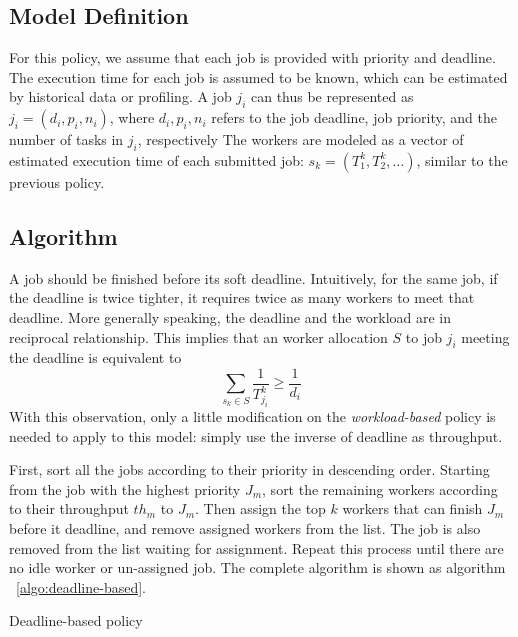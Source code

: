 \subsection{Model Definition}

For this policy, we assume that each job is provided with priority and
deadline.
The execution time for each job is assumed to be known, which can be 
estimated by historical data or profiling.
A job $j_i$ can thus be represented as $j_i = (d_i, p_i, n_i)$, where
$d_i, p_i, n_i$ refers to the job deadline, job priority, and the 
number of tasks in $j_i$, respectively
The workers are modeled as a vector of estimated execution time of each 
submitted job: $s_k = (T^k_1, T^k_2, \ldots)$, similar to the previous 
policy.

\subsection{Algorithm}

A job should be finished before its soft deadline.
Intuitively, for the same job, if the deadline is twice tighter, it
requires twice as many workers to meet that deadline.
More generally speaking, the deadline and the workload are in reciprocal
relationship.
This implies that an worker allocation $S$ to job $j_i$ meeting the
deadline is equivalent to
\[\displaystyle\sum_{s_k \in S}\frac{1}{T^k_{j_i}} \geq \frac{1}{d_i}\]
With this observation, only a little modification on the
\emph{workload-based} policy is needed to apply to this model: simply
use the inverse of deadline as throughput.

First, sort all the jobs according to their priority in descending
order.
Starting from the job with the highest priority $J_m$, sort the
remaining workers according to their throughput $th_m$ to $J_m$.
Then assign the top $k$ workers that can finish $J_m$ before it 
deadline, and remove assigned workers from the list.
The job is also removed from the list waiting for assignment.
Repeat this process until there are no idle worker or un-assigned job.
The complete algorithm is shown as algorithm ~\ref{algo:deadline-based}.

\begin{algorithm}[htbp]
  
  \caption{Deadline-based policy}
  \label{algo:deadline-based}
\end{algorithm}

